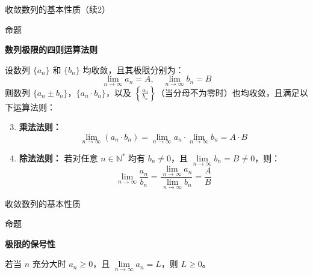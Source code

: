 \documentclass[aspectratio=169,10pt,fontset=fandol]{ctexbeamer}
\newenvironment{custom}[1]{\par\noindent\textbf{#1}\quad}{\par\vspace{0.8em}}
\begin{document}
\begin{frame}[t,fragile]{收敛数列的基本性质（续2）}
\footnotesize
\begin{block}{命题}
{\footnotesize
\textbf{数列极限的四则运算法则}\par



设数列 $\{a_n\}$ 和 $\{b_n\}$ 均收敛，且其极限分别为：
\begin{equation*}
	\lim\limits_{n \to \infty} a_n = A, \quad \lim\limits_{n \to \infty} b_n = B
\end{equation*}
则数列 $\{a_n \pm b_n\}$，$\{a_n \cdot b_n\}$，以及 $\left\{\frac{a_n}{b_n}\right\}$（当分母不为零时）也均收敛，且满足以下运算法则：

\begin{enumerate}
	\setcounter{enumi}{2}
\item \textbf{乘法法则：}
	\begin{equation*}
		\lim_{n \to \infty} (a_n \cdot b_n) = \lim_{n \to \infty} a_n \cdot \lim_{n \to \infty} b_n = A \cdot B
	\end{equation*}
	
	\item \textbf{除法法则：}
	若对任意 $n \in \mathbb{N}^*$ 均有 $b_n \neq 0$，且 $\lim\limits_{n \to \infty} b_n = B \neq 0$，则：
	\begin{equation*}
		\lim_{n \to \infty} \frac{a_n}{b_n} = \frac{\lim\limits_{n \to \infty} a_n}{\lim\limits_{n \to \infty} b_n} = \frac{A}{B}
	\end{equation*}
\end{enumerate}

}
\end{block}
\end{frame}
\begin{frame}[t,fragile]{收敛数列的基本性质}
\normalsize
\begin{block}{命题}
{\normalsize
\textbf{极限的保号性}\par

	 若当 \(n\) 充分大时 \(a_n \geq 0\)，且 \(\lim\limits_{n \to \infty} a_n = L\)，则 \(L \geq 0\)。

}
\end{block}
\end{frame}
\end{document}
